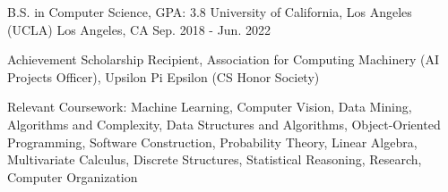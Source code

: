 

\begin{cventries}

  \cventry
    {B.S. in Computer Science, GPA: 3.8} %
    {University of California, Los Angeles (UCLA)} %
    {Los Angeles, CA} %
    {Sep. 2018 - Jun. 2022} %
    {
      \begin{cvitems} %
        \item {Achievement Scholarship Recipient, Association for Computing Machinery
        (AI Projects Officer), Upsilon Pi Epsilon (CS Honor Society)}
        \item {Relevant Coursework: Machine Learning, Computer Vision, Data Mining,
        Algorithms and Complexity, Data Structures and Algorithms, Object-Oriented 
        Programming, Software Construction, Probability Theory, Linear Algebra, 
        Multivariate Calculus, Discrete Structures, Statistical Reasoning, 
        Research, Computer Organization}
      \end{cvitems}
    }

\end{cventries}
